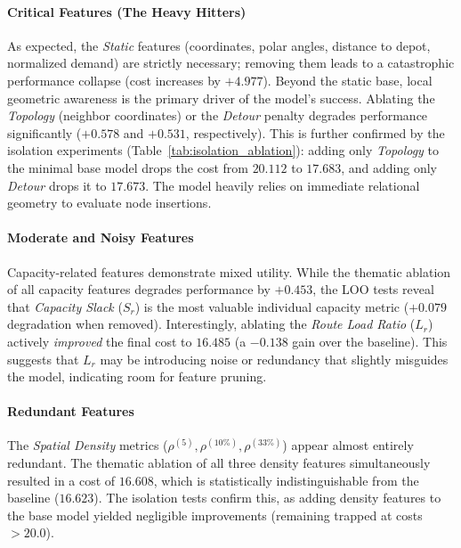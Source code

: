 \documentclass[letterpaper]{article} %
\begin{document}
\paragraph{Critical Features (The Heavy Hitters)}
As expected, the \textit{Static} features (coordinates, polar angles, distance to depot, normalized demand) are strictly necessary; removing them leads to a catastrophic performance collapse (cost increases by $+4.977$). Beyond the static base, local geometric awareness is the primary driver of the model's success. Ablating the \textit{Topology} (neighbor coordinates) or the \textit{Detour} penalty degrades performance significantly ($+0.578$ and $+0.531$, respectively). This is further confirmed by the isolation experiments (Table~\ref{tab:isolation_ablation}): adding only \textit{Topology} to the minimal base model drops the cost from $20.112$ to $17.683$, and adding only \textit{Detour} drops it to $17.673$. The model heavily relies on immediate relational geometry to evaluate node insertions.

\paragraph{Moderate and Noisy Features}
Capacity-related features demonstrate mixed utility. While the thematic ablation of all capacity features degrades performance by $+0.453$, the LOO tests reveal that \textit{Capacity Slack} ($S_r$) is the most valuable individual capacity metric ($+0.079$ degradation when removed). Interestingly, ablating the \textit{Route Load Ratio} ($L_r$) actively \textit{improved} the final cost to $16.485$ (a $-0.138$ gain over the baseline). This suggests that $L_r$ may be introducing noise or redundancy that slightly misguides the model, indicating room for feature pruning.

\paragraph{Redundant Features}
The \textit{Spatial Density} metrics ($\rho^{(5)}, \rho^{(10\%)}, \rho^{(33\%)}$) appear almost entirely redundant. The thematic ablation of all three density features simultaneously resulted in a cost of $16.608$, which is statistically indistinguishable from the baseline ($16.623$). The isolation tests confirm this, as adding density features to the base model yielded negligible improvements (remaining trapped at costs $>20.0$). 
\end{document}

